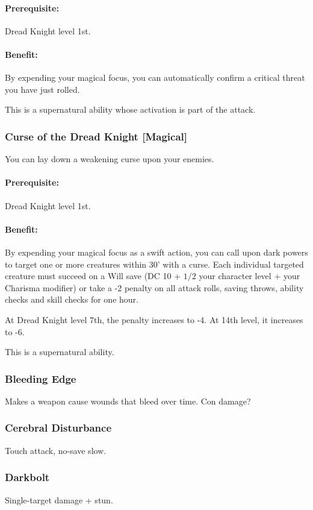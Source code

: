 \paragraph{Prerequisite:} Dread Knight level 1st.

\paragraph{Benefit:}
By expending your magical focus, you can automatically confirm a critical threat you have just rolled.

This is a supernatural ability whose activation is part of the attack.
\subsubsection[Curse of the Dread Knight]{Curse of the Dread Knight [Magical]}
\label{Feat:CurseOfTheDreadKnight}
You can lay down a weakening curse upon your enemies.

\paragraph{Prerequisite:} Dread Knight level 1st.

\paragraph{Benefit:}
By expending your magical focus as a swift action, 
you can call upon dark powers to target one or more creatures within 30' with a curse.
Each individual targeted creature must succeed on a Will save (DC 10 + $1/2$ your character level + your Charisma modifier) 
or take a -2 penalty on all attack rolls, saving throws, ability checks and skill checks for one hour.

At Dread Knight level 7th, the penalty increases to -4. At 14th level, it increases to -6.

This is a supernatural ability.
\subsubsection{Bleeding Edge}
Makes a weapon cause wounds that bleed over time. Con damage?
\subsubsection{Cerebral Disturbance}
Touch attack, no-save slow.
\subsubsection{Darkbolt}
Single-target damage + stun.
